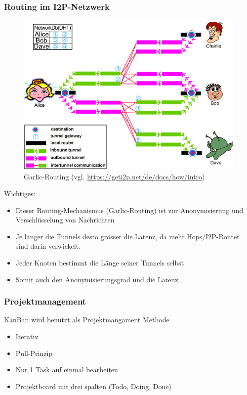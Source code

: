 \documentclass{beamer}
\begin{document}
    \begin{frame}[allowframebreaks]
        \frametitle{Routing im I2P-Netzwerk}

        \begin{figure}[t]
            \includegraphics[height=0.69\textheight]{img/i2prouting.png}
            \caption{Garlic-Routing (vgl. \url{https://geti2p.net/de/docs/how/intro})}
        \end{figure}

        Wichtiges:

        \begin{itemize}
            \item Dieser Routing-Mechanismus (Garlic-Routing) ist zur Anonymisierung und Verschlüsselung von Nachrichten
            \item Je länger die Tunnels desto grösser die Latenz, da mehr Hops/I2P-Router sind darin verwickelt.
            \item Jeder Knoten bestimmt die Länge seiner Tunnels selbst
            \item Somit auch den Anonymisierungsgrad und die Latenz
        \end{itemize}

    \end{frame}


    \begin{frame}
        \frametitle{Projektmanagement}

        KanBan wird benutzt als Projektmangament Methode

        \begin{itemize}
            \item Iterativ
            \item Pull-Prinzip
            \item Nur 1 Task auf einmal bearbeiten
            \item Projektboard mit drei spalten (Todo, Doing, Done)
        \end{itemize}
    \end{frame} %
\end{document}
